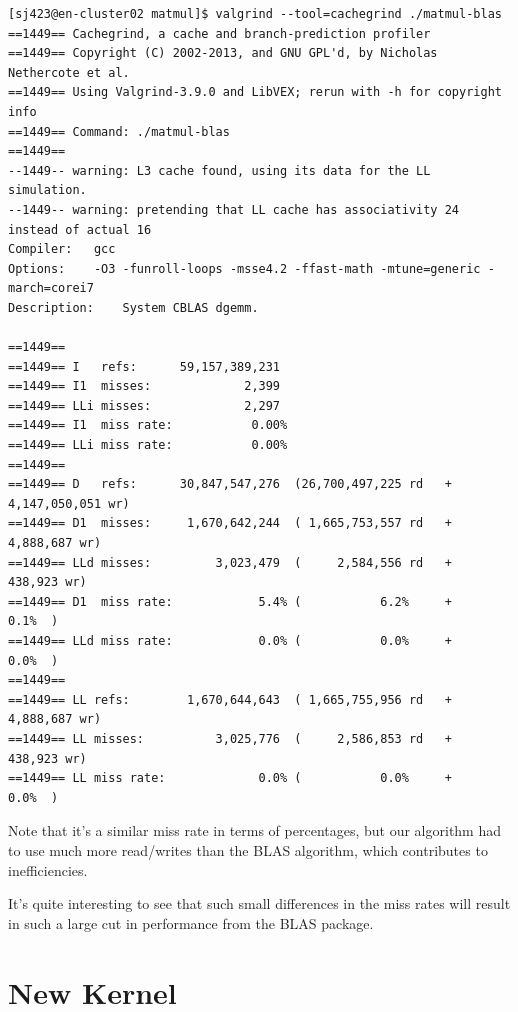 \documentclass{article}
\begin{document}
    \begin{lstlisting}
[sj423@en-cluster02 matmul]$ valgrind --tool=cachegrind ./matmul-blas 
==1449== Cachegrind, a cache and branch-prediction profiler
==1449== Copyright (C) 2002-2013, and GNU GPL'd, by Nicholas Nethercote et al.
==1449== Using Valgrind-3.9.0 and LibVEX; rerun with -h for copyright info
==1449== Command: ./matmul-blas
==1449== 
--1449-- warning: L3 cache found, using its data for the LL simulation.
--1449-- warning: pretending that LL cache has associativity 24 instead of actual 16
Compiler:	gcc
Options:	-O3 -funroll-loops -msse4.2 -ffast-math -mtune=generic -march=corei7
Description:	System CBLAS dgemm.

==1449== 
==1449== I   refs:      59,157,389,231
==1449== I1  misses:             2,399
==1449== LLi misses:             2,297
==1449== I1  miss rate:           0.00%
==1449== LLi miss rate:           0.00%
==1449== 
==1449== D   refs:      30,847,547,276  (26,700,497,225 rd   + 4,147,050,051 wr)
==1449== D1  misses:     1,670,642,244  ( 1,665,753,557 rd   +     4,888,687 wr)
==1449== LLd misses:         3,023,479  (     2,584,556 rd   +       438,923 wr)
==1449== D1  miss rate:            5.4% (           6.2%     +           0.1%  )
==1449== LLd miss rate:            0.0% (           0.0%     +           0.0%  )
==1449== 
==1449== LL refs:        1,670,644,643  ( 1,665,755,956 rd   +     4,888,687 wr)
==1449== LL misses:          3,025,776  (     2,586,853 rd   +       438,923 wr)
==1449== LL miss rate:             0.0% (           0.0%     +           0.0%  )
    \end{lstlisting}

    Note that it's a similar miss rate in terms of percentages, but our algorithm had to
    use much more read/writes than the BLAS algorithm, which contributes to inefficiencies.

    It's quite interesting to see that such small differences in the miss rates will result in such a large cut in performance
    from the BLAS package.

    \section{New Kernel}
\end{document}
